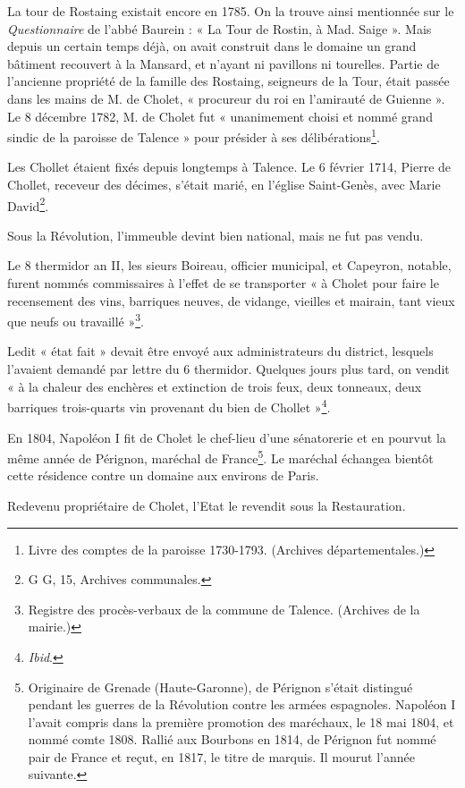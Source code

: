 La tour de Rostaing existait encore en 1785. On la trouve ainsi mentionnée sur le \textit{Questionnaire} de l'abbé Baurein : « La Tour de Rostin, à Mad. Saige ». Mais depuis un certain temps déjà, on avait construit dans le domaine un grand bâtiment recouvert à la Mansard, et n'ayant ni pavillons ni tourelles. Partie de l'ancienne propriété de la famille des Rostaing, seigneurs de la Tour, était passée dans les mains de M. de Cholet, « procureur du roi en l'amirauté de Guienne ». Le 8 décembre 1782, M. de Cholet fut « unanimement choisi et nommé grand sindic de la paroisse de Talence » pour présider à ses délibérations\footnote{Livre des comptes de la paroisse 1730-1793. (Archives départementales.)}.

Les Chollet étaient fixés depuis longtemps à Talence. Le 6 février 1714, Pierre de Chollet, receveur des décimes, s'était marié, en l'église Saint-Genès, avec Marie David\footnote{G G, 15, Archives communales.}.

Sous la Révolution, l'immeuble devint bien national, mais ne fut pas vendu.

Le 8 thermidor an II, les sieurs Boireau, officier municipal, et Capeyron, notable, furent nommés commissaires à l'effet de se transporter « à Cholet pour faire le recensement des vins, barriques neuves, de vidange, vieilles et mairain, tant vieux que neufs ou travaillé »\footnote{Registre des procès-verbaux de la commune de Talence. (Archives de la mairie.)}.

Ledit « état fait » devait être envoyé aux administrateurs du district, lesquels l'avaient demandé par lettre du 6 thermidor. Quelques jours plus tard, on vendit « à la chaleur des enchères et extinction de trois feux, deux tonneaux, deux barriques trois-quarts vin provenant du bien de Chollet »\footnote{\textit{Ibid}.}.

En 1804, Napoléon I\ier{} fit de Cholet le chef-lieu d'une sénatorerie et en pourvut la même année de Pérignon, maréchal de France\footnote{Originaire de Grenade (Haute-Garonne), de Pérignon s'était distingué pendant les guerres de la Révolution contre les armées espagnoles. Napoléon I\ier{} l'avait compris dans la première promotion des maréchaux, le 18 mai 1804, et nommé comte 1808. Rallié aux Bourbons en 1814, de Pérignon fut nommé pair de France et reçut, en 1817, le titre de marquis. Il mourut l'année suivante.}. Le maréchal échangea bientôt cette résidence contre un domaine aux environs de Paris.

Redevenu propriétaire de Cholet, l'Etat le revendit sous la Restauration.

